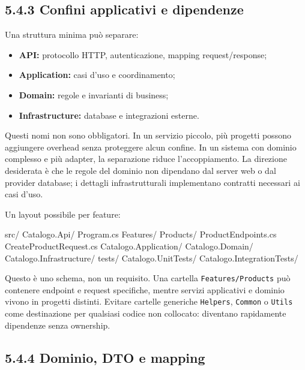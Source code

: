 \documentclass[
  italian,
  10pt,
]{book}
\newenvironment{Shaded}{\begin{snugshade}}{\end{snugshade}}
\newcommand{\NormalTok}[1]{#1}
\providecommand{\tightlist}{%
  \setlength{\itemsep}{0pt}\setlength{\parskip}{0pt}}
\begin{document}
\subsection{5.4.3 Confini applicativi e
dipendenze}\label{confini-applicativi-e-dipendenze}

Una struttura minima può separare:

\begin{itemize}
\tightlist
\item
  \textbf{API:} protocollo HTTP, autenticazione, mapping
  request/response;
\item
  \textbf{Application:} casi d'uso e coordinamento;
\item
  \textbf{Domain:} regole e invarianti di business;
\item
  \textbf{Infrastructure:} database e integrazioni esterne.
\end{itemize}

Questi nomi non sono obbligatori. In un servizio piccolo, più progetti
possono aggiungere overhead senza proteggere alcun confine. In un
sistema con dominio complesso e più adapter, la separazione riduce
l'accoppiamento. La direzione desiderata è che le regole del dominio non
dipendano dal server web o dal provider database; i dettagli
infrastrutturali implementano contratti necessari ai casi d'uso.

Un layout possibile per feature:

\begin{Shaded}
\begin{Highlighting}[]
\NormalTok{src/}
\NormalTok{  Catalogo.Api/}
\NormalTok{    Program.cs}
\NormalTok{    Features/}
\NormalTok{      Products/}
\NormalTok{        ProductEndpoints.cs}
\NormalTok{        CreateProductRequest.cs}
\NormalTok{  Catalogo.Application/}
\NormalTok{  Catalogo.Domain/}
\NormalTok{  Catalogo.Infrastructure/}
\NormalTok{tests/}
\NormalTok{  Catalogo.UnitTests/}
\NormalTok{  Catalogo.IntegrationTests/}
\end{Highlighting}
\end{Shaded}

Questo è uno schema, non un requisito. Una cartella
\texttt{Features/Products} può contenere endpoint e request specifiche,
mentre servizi applicativi e dominio vivono in progetti distinti.
Evitare cartelle generiche \texttt{Helpers}, \texttt{Common} o
\texttt{Utils} come destinazione per qualsiasi codice non collocato:
diventano rapidamente dipendenze senza ownership.

\subsection{5.4.4 Dominio, DTO e mapping}\label{dominio-dto-e-mapping}
\end{document}
